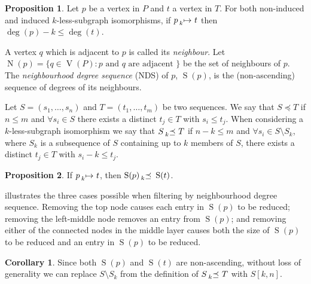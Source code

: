 \documentclass[letterpaper]{article}
\theoremstyle{definition}
\newtheorem{proposition}{Proposition}
\newtheorem{corollary}{Corollary}
\newcommand{\lessmap}[1]{\prescript{}{#1}{\mapsto}\ }
\newcommand{\lesspreceq}[1]{\prescript{}{#1}{\preceq}\ }
\newcommand{\V}{\operatorname{V}}
\newcommand{\N}{\operatorname{N}}
\newcommand{\nds}{\operatorname{S}}
\begin{document}
\begin{proposition}
    \label{prop:deg}
    Let $p$ be a vertex in $P$ and $t$ a vertex in $T$. For both non-induced and induced
    $k$-less-subgraph isomorphisms, if $p \lessmap{k} t$ then
    $\deg(p) - k \le \deg(t)$.
\end{proposition}

A vertex $q$ which is adjacent to $p$ is called its \emph{neighbour}.  Let $\N(p) = \{ q \in \V(P) :
 p \text{ and } q \text{ are adjacent }\}$ be the set of neighbours of $p$.  The \emph{neighbourhood
degree sequence} (NDS) of $p$, $\nds(p)$, is the (non-ascending) sequence of degrees of its
neighbours.

Let $S = ( s_1 , \ldots , s_n )$ and $T = ( t_1 , \ldots , t_m)$ be two sequences.  We say that $S
\preceq T$ if $n \leq m$ and $\forall s_i \in S$ there exists a distinct $t_j \in T$ with $s_i \leq
t_j$.  When considering a $k$-less-subgraph isomorphism we say that $S \lesspreceq{k}
T$ if $n - k \leq m$ and $\forall s_i \in S \setminus S_k$, where $S_k$ is a subsequence of $S$
containing up to $k$ members of $S$, there exists a distinct $t_j \in T$ with $s_i - k \leq t_j$.


\begin{proposition}\label{prop:nds}
If $p \lessmap{k} t$, then $\nds(p) \lesspreceq{k} \nds(t)$.
\end{proposition}

 illustrates the three cases possible when filtering by neighbourhood degree
sequence.  Removing the top node causes each entry in $\nds(p)$ to be reduced; removing the
left-middle node removes an entry from $\nds(p)$; and removing either of the connected nodes in the
middle layer causes both the size of $\nds(p)$ to be reduced and an entry in $\nds(p)$ to be reduced.

\begin{corollary}
Since both $\nds(p)$ and $\nds(t)$ are non-ascending, without loss of generality we can replace
$S \setminus S_k$ from the definition of $S \lesspreceq{k} T$ with $S[k, n]$.
\end{corollary}


\end{document}
